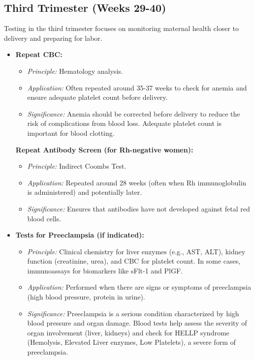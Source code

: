 \documentclass{article}
\begin{document}
\subsection{Third Trimester (Weeks 29-40)}
Testing in the third trimester focuses on monitoring maternal health closer to delivery and preparing for labor.

\begin{itemize}
    \item \textbf{Repeat CBC:}
    \begin{itemize}
        \item \textit{Principle:} Hematology analysis.
        \item \textit{Application:} Often repeated around 35-37 weeks to check for anemia and ensure adequate platelet count before delivery.
        \item \textit{Significance:} Anemia should be corrected before delivery to reduce the risk of complications from blood loss. Adequate platelet count is important for blood clotting.
    \end{itemize}
    \textbf{Repeat Antibody Screen (for Rh-negative women):}
    \begin{itemize}
        \item \textit{Principle:} Indirect Coombs Test.
        \item \textit{Application:} Repeated around 28 weeks (often when Rh immunoglobulin is administered) and potentially later.
        \item \textit{Significance:} Ensures that antibodies have not developed against fetal red blood cells.
    \end{itemize}
    \item \textbf{Tests for Preeclampsia (if indicated):}
    \begin{itemize}
        \item \textit{Principle:} Clinical chemistry for liver enzymes (e.g., AST, ALT), kidney function (creatinine, urea), and CBC for platelet count. In some cases, immunoassays for biomarkers like sFlt-1 and PlGF.
        \item \textit{Application:} Performed when there are signs or symptoms of preeclampsia (high blood pressure, protein in urine).
        \item \textit{Significance:} Preeclampsia is a serious condition characterized by high blood pressure and organ damage. Blood tests help assess the severity of organ involvement (liver, kidneys) and check for HELLP syndrome (Hemolysis, Elevated Liver enzymes, Low Platelets), a severe form of preeclampsia.
    \end{itemize}
\end{itemize}
\end{document}
